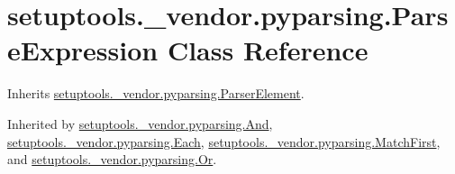 \hypertarget{classsetuptools_1_1__vendor_1_1pyparsing_1_1_parse_expression}{}\section{setuptools.\+\_\+vendor.\+pyparsing.\+Parse\+Expression Class Reference}
\label{classsetuptools_1_1__vendor_1_1pyparsing_1_1_parse_expression}


Inherits \hyperlink{classsetuptools_1_1__vendor_1_1pyparsing_1_1_parser_element}{setuptools.\+\_\+vendor.\+pyparsing.\+Parser\+Element}.



Inherited by \hyperlink{classsetuptools_1_1__vendor_1_1pyparsing_1_1_and}{setuptools.\+\_\+vendor.\+pyparsing.\+And}, \hyperlink{classsetuptools_1_1__vendor_1_1pyparsing_1_1_each}{setuptools.\+\_\+vendor.\+pyparsing.\+Each}, \hyperlink{classsetuptools_1_1__vendor_1_1pyparsing_1_1_match_first}{setuptools.\+\_\+vendor.\+pyparsing.\+Match\+First}, and \hyperlink{classsetuptools_1_1__vendor_1_1pyparsing_1_1_or}{setuptools.\+\_\+vendor.\+pyparsing.\+Or}.

